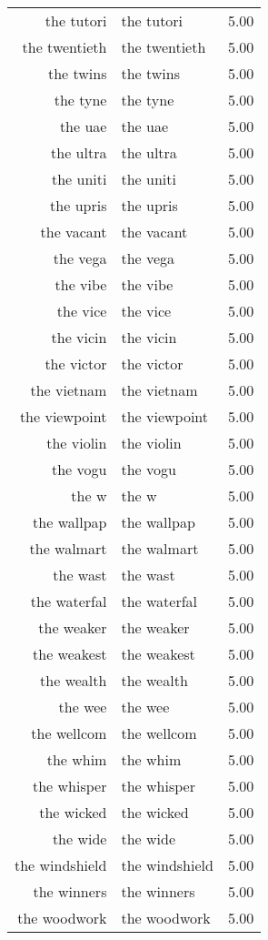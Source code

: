 \begin{table}[ht]
\begin{tabular}{rlr}
  the tutori & the tutori & 5.00 \\ 
  the twentieth & the twentieth & 5.00 \\ 
  the twins & the twins & 5.00 \\ 
  the tyne & the tyne & 5.00 \\ 
  the uae & the uae & 5.00 \\ 
  the ultra & the ultra & 5.00 \\ 
  the uniti & the uniti & 5.00 \\ 
  the upris & the upris & 5.00 \\ 
  the vacant & the vacant & 5.00 \\ 
  the vega & the vega & 5.00 \\ 
  the vibe & the vibe & 5.00 \\ 
  the vice & the vice & 5.00 \\ 
  the vicin & the vicin & 5.00 \\ 
  the victor & the victor & 5.00 \\ 
  the vietnam & the vietnam & 5.00 \\ 
  the viewpoint & the viewpoint & 5.00 \\ 
  the violin & the violin & 5.00 \\ 
  the vogu & the vogu & 5.00 \\ 
  the w & the w & 5.00 \\ 
  the wallpap & the wallpap & 5.00 \\ 
  the walmart & the walmart & 5.00 \\ 
  the wast & the wast & 5.00 \\ 
  the waterfal & the waterfal & 5.00 \\ 
  the weaker & the weaker & 5.00 \\ 
  the weakest & the weakest & 5.00 \\ 
  the wealth & the wealth & 5.00 \\ 
  the wee & the wee & 5.00 \\ 
  the wellcom & the wellcom & 5.00 \\ 
  the whim & the whim & 5.00 \\ 
  the whisper & the whisper & 5.00 \\ 
  the wicked & the wicked & 5.00 \\ 
  the wide & the wide & 5.00 \\ 
  the windshield & the windshield & 5.00 \\ 
  the winners & the winners & 5.00 \\ 
  the woodwork & the woodwork & 5.00 \\ 

\end{tabular}
\end{table}
